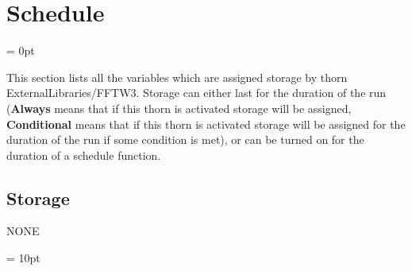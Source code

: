 
\section{Schedule} 


\parskip = 0pt


\noindent This section lists all the variables which are assigned storage by thorn ExternalLibraries/FFTW3.  Storage can either last for the duration of the run ({\bf Always} means that if this thorn is activated storage will be assigned, {\bf Conditional} means that if this thorn is activated storage will be assigned for the duration of the run if some condition is met), or can be turned on for the duration of a schedule function.


\subsection*{Storage}NONE

\vspace{5mm}\parskip = 10pt 
